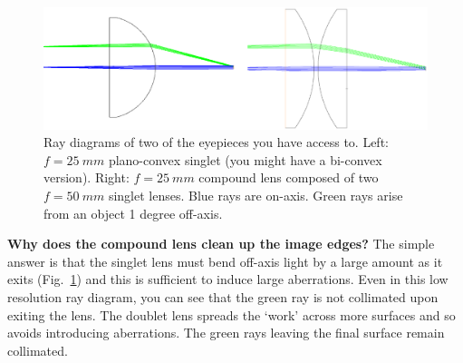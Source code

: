 \documentclass[a4paper]{report}
\begin{document}
\begin{figure}[h]
\center
\includegraphics[width=4.5in]{eyepiece_compare.eps}
\caption{Ray diagrams of two of the eyepieces you have access to. Left: $f=25~mm$ plano-convex singlet (you might have a bi-convex version). 
Right: $f=25~mm$ compound lens composed of two $f=50~mm$ singlet lenses. 
Blue rays are on-axis. 
Green rays arise from an object 1 degree off-axis. }
\label{fig:composite}
\end{figure}


\textbf{Why does the compound lens clean up the image edges?} 
The simple answer is that the singlet lens must bend off-axis light by a large amount as it exits (Fig.~\ref{fig:composite}) and this is sufficient to induce large aberrations. 
Even in this low resolution ray diagram, you can see that the green ray is not collimated upon exiting the lens.
The doublet lens spreads the `work' across more surfaces and so avoids introducing aberrations. 
The green rays leaving the final surface remain collimated. 
\end{document}
